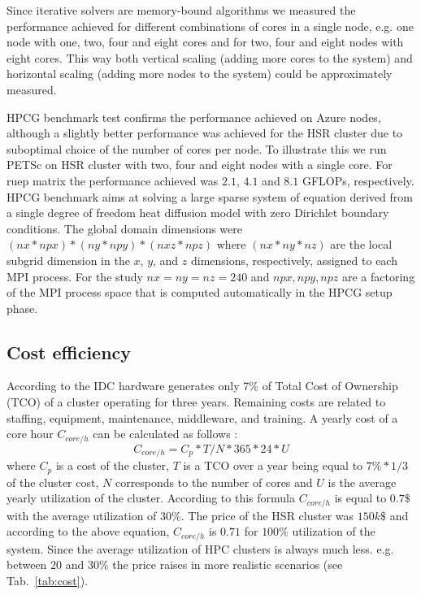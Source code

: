 \documentclass[3p,times]{elsarticle}
\begin{document}
Since iterative solvers are memory-bound algorithms we measured the performance achieved for different combinations of cores in a single node, e.g. one node with one, two, four and eight cores and for two, four and eight nodes with eight cores. This way both vertical scaling (adding more cores to the system) and horizontal scaling (adding more nodes to the system) could be approximately measured. %

HPCG benchmark test confirms the performance achieved on Azure nodes, although a slightly better performance was achieved for the HSR cluster due to suboptimal choice of the number of cores per node.  To illustrate this we run PETSc on HSR cluster with two, four and eight nodes with a single core. For ruep matrix the performance achieved was $2.1$, $4.1$ and $8.1$ GFLOPs, respectively. HPCG benchmark aims at solving a large sparse system of equation derived from a single degree of freedom heat diffusion model with zero Dirichlet boundary conditions. The global domain dimensions were $(nx * npx ) * (ny * npy ) * (nxz * npz )$ where $(nx * ny * nz )$ are the local subgrid dimension in the $x$, $y$, and $z$ dimensions, respectively, assigned to each MPI process. For the study $nx = ny = nz = 240$ and $npx, npy, npz$ are a factoring of the MPI process space that is computed automatically in the HPCG setup phase.


\subsection{Cost efficiency}

According to the IDC \cite{Perry2007} hardware generates only 7\% of Total Cost of Ownership (TCO) of a cluster operating for three years. Remaining costs are related to staffing, equipment, maintenance, middleware, and training. A yearly cost of a core hour $C_{core/h}$ can be calculated as follows \cite{ubercloud}:
$$ 
C_{core/h} = { C_p * T } / { N * 365 * 24 * U } 
$$
where $C_p$ is a cost of the cluster, $T$ is a TCO over a year being equal to $7\% * 1/3$ of the cluster cost, $N$ corresponds to the number of cores and $U$ is the average yearly utilization of the cluster. According to this formula $C_{core/h}$ is equal to $0.7\$$ with the average utilization of $30\%$. The price of the HSR cluster was $150k\$$ and according to the above equation, $C_{core/h}$ is $0.71$ for $100\%$ utilization of the system. Since the average utilization of HPC clusters is always much less. e.g. between $20$ and $30 \%$ \cite{Delimitrou:2014:QRQ:2541940.2541941} the price raises in more realistic scenarios (see Tab.~\ref{tab:cost}).
\end{document}
